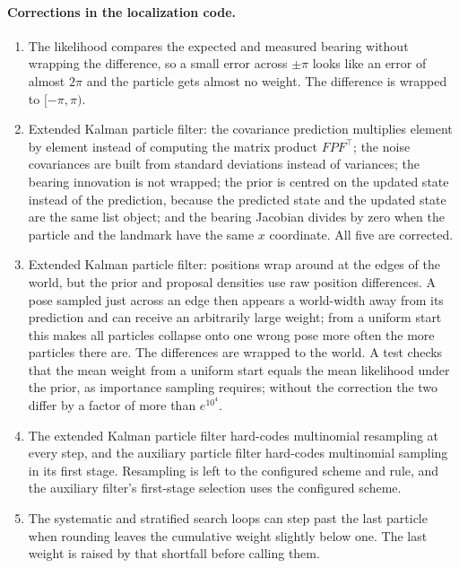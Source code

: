 \paragraph{Corrections in the localization code.}
\begin{enumerate}
  \item The likelihood compares the expected and measured bearing without wrapping the difference, so a small error
        across $\pm\pi$ looks like an error of almost $2\pi$ and the particle gets almost no weight. The difference is
        wrapped to $[-\pi, \pi)$.
  \item Extended Kalman particle filter: the covariance prediction multiplies element by element instead of computing
        the matrix product $F P F^\top$; the noise covariances are built from standard deviations instead of variances;
        the bearing innovation is not wrapped; the prior is centred on the updated state instead of the prediction,
        because the predicted state and the updated state are the same list object; and the bearing Jacobian divides
        by zero when the particle and the landmark have the same $x$ coordinate. All five are corrected.
  \item Extended Kalman particle filter: positions wrap around at the edges of the world, but the prior and proposal
        densities use raw position differences. A pose sampled just across an edge then appears a world-width away from
        its prediction and can receive an arbitrarily large weight; from a uniform start this makes all particles
        collapse onto one wrong pose more often the more particles there are. The differences are wrapped to the world.
        A test checks that the mean weight from a uniform start equals the mean likelihood under the prior, as importance
        sampling requires; without the correction the two differ by a factor of more than $e^{10^4}$.
  \item The extended Kalman particle filter hard-codes multinomial resampling at every step, and the auxiliary particle
        filter hard-codes multinomial sampling in its first stage. Resampling is left to the configured scheme and rule,
        and the auxiliary filter's first-stage selection uses the configured scheme.
  \item The systematic and stratified search loops can step past the last particle when rounding leaves the cumulative
        weight slightly below one. The last weight is raised by that shortfall before calling them.
\end{enumerate}

